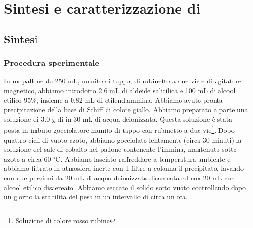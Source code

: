 \section{Sintesi e caratterizzazione di }
\subsection{Sintesi}
\subsubsection{Procedura sperimentale}
In un pallone da 250 mL, munito di tappo, di rubinetto a due vie e di agitatore magnetico, abbiamo introdotto 2.6 mL  di aldeide salicilica e 100 mL di alcool etilico 95\%, insieme a 0.82 mL  di etilendiammina. Abbiamo avuto pronta precipitazione della base di Schiff di colore giallo. Abbiamo preparato a parte una soluzione di 3.0 g  di  in 30 mL di acqua deionizzata. Questa soluzione è stata posta in imbuto gocciolatore munito di tappo con rubinetto a due vie\footnote{Soluzione di colore rosso rubino}. Dopo quattro cicli di vuoto-azoto, abbiamo gocciolato lentamente (circa 30 minuti) la soluzione del sale di cobalto nel pallone contenente l'immina, mantenuto  sotto azoto a circa 60 °C. Abbiamo lasciato raffreddare a temperatura ambiente e abbiamo filtrato in atmosfera inerte con il filtro a colonna il precipitato, lavando con due porzioni da 20 mL  di acqua deionizzata disaereata ed con 20 mL con alcool etilico disaereato. Abbiamo seccato il solido sotto vuoto controllando dopo un giorno la stabilità del peso in un intervallo di circa un'ora. 
